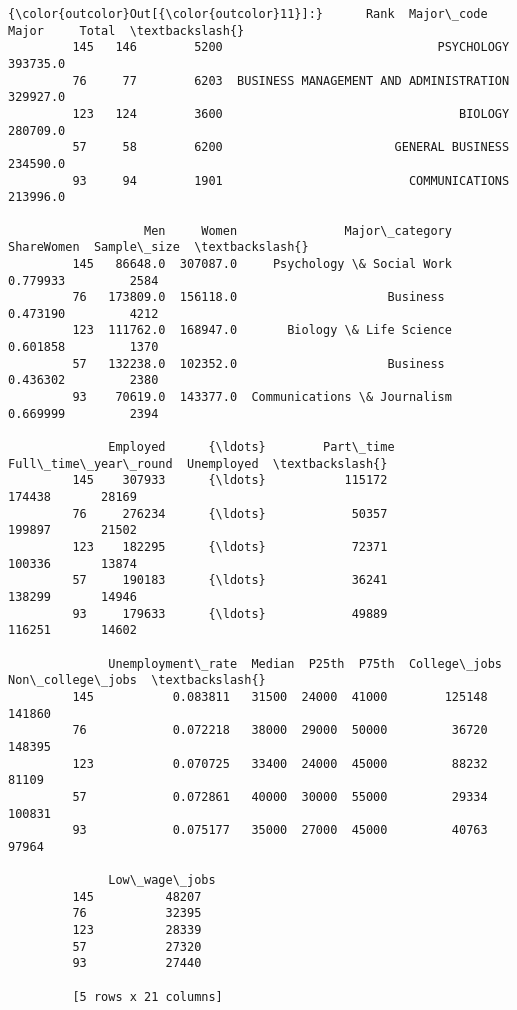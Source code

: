 \documentclass[11pt]{article}
\begin{document}
\begin{Verbatim}[commandchars=\\\{\}]
{\color{outcolor}Out[{\color{outcolor}11}]:}      Rank  Major\_code                                   Major     Total  \textbackslash{}
         145   146        5200                              PSYCHOLOGY  393735.0   
         76     77        6203  BUSINESS MANAGEMENT AND ADMINISTRATION  329927.0   
         123   124        3600                                 BIOLOGY  280709.0   
         57     58        6200                        GENERAL BUSINESS  234590.0   
         93     94        1901                          COMMUNICATIONS  213996.0   
         
                   Men     Women               Major\_category  ShareWomen  Sample\_size  \textbackslash{}
         145   86648.0  307087.0     Psychology \& Social Work    0.779933         2584   
         76   173809.0  156118.0                     Business    0.473190         4212   
         123  111762.0  168947.0       Biology \& Life Science    0.601858         1370   
         57   132238.0  102352.0                     Business    0.436302         2380   
         93    70619.0  143377.0  Communications \& Journalism    0.669999         2394   
         
              Employed      {\ldots}        Part\_time  Full\_time\_year\_round  Unemployed  \textbackslash{}
         145    307933      {\ldots}           115172                174438       28169   
         76     276234      {\ldots}            50357                199897       21502   
         123    182295      {\ldots}            72371                100336       13874   
         57     190183      {\ldots}            36241                138299       14946   
         93     179633      {\ldots}            49889                116251       14602   
         
              Unemployment\_rate  Median  P25th  P75th  College\_jobs  Non\_college\_jobs  \textbackslash{}
         145           0.083811   31500  24000  41000        125148            141860   
         76            0.072218   38000  29000  50000         36720            148395   
         123           0.070725   33400  24000  45000         88232             81109   
         57            0.072861   40000  30000  55000         29334            100831   
         93            0.075177   35000  27000  45000         40763             97964   
         
              Low\_wage\_jobs  
         145          48207  
         76           32395  
         123          28339  
         57           27320  
         93           27440  
         
         [5 rows x 21 columns]
\end{Verbatim}
            
\end{document}
